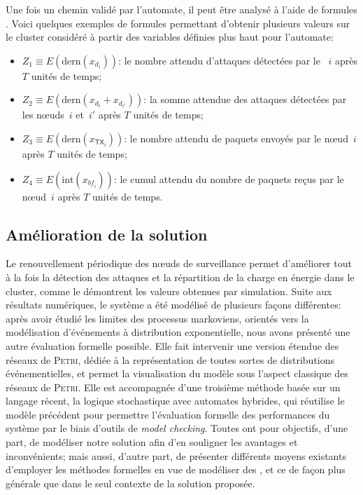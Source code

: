 Une fois un chemin validé par l'automate, il peut être analysé à l'aide de formules \lsah.
Voici quelques exemples de formules \lsah permettant d'obtenir plusieurs valeurs sur le cluster considéré à partir des variables définies plus haut pour l'automate:
\begin{itemize}
    \item $Z_1\equiv E(\mbox{dern}(x_{d_i}))$: le nombre attendu d'attaques détectées par le \cn~$i$ après $T$ unités de temps;
    \item $Z_2\equiv E(\mbox{dern}(x_{d_i}+x_{d_{i'}}))$: la somme attendue des attaques détectées par les nœuds~$i$ et~$i'$ après $T$ unités de temps;
    \item $Z_3\equiv E(\mbox{dern}(x_{\mathsf{TX}_i}))$: le nombre attendu de paquets envoyés par le nœud~$i$ après $T$ unités de temps;
    \item $Z_4\equiv E(\mbox{int}(x_{\mathit{bf}_i}))$: le cumul attendu du nombre de paquets reçus par le nœud~$i$ après $T$ unités de temps.
\end{itemize}

    \subsection{Amélioration de la solution}

Le renouvellement périodique des nœuds de surveillance permet d'améliorer tout à la fois la détection des attaques et la répartition de la charge en énergie dans le cluster, comme le démontrent les valeurs obtenues par simulation.
Suite aux résultats numériques, le système a été modélisé de plusieurs façons différentes: après avoir étudié les limites des processus markoviens, orientés vers la modélisation d'événements à distribution exponentielle, nous avons présenté une autre évaluation formelle possible.
Elle fait intervenir une version étendue des réseaux de \textsc{Petri}, dédiée à la représentation de toutes sortes de distributions événementielles, et permet la visualisation du modèle sous l'aspect classique des réseaux de \textsc{Petri}.
Elle est accompagnée d'une troisième méthode basée sur un langage récent, la logique stochastique avec automates hybrides, qui réutilise le modèle précédent pour permettre l'évaluation formelle des performances du système par le biais d'outils de \textit{model checking}.
Toutes ont pour objectifs, d'une part, de modéliser notre solution afin d'en souligner les avantages et inconvénients; mais aussi, d'autre part, de présenter différents moyens existants d'employer les méthodes formelles en vue de modéliser des \rcs, et ce de façon plus générale que dans le seul contexte de la solution proposée.

